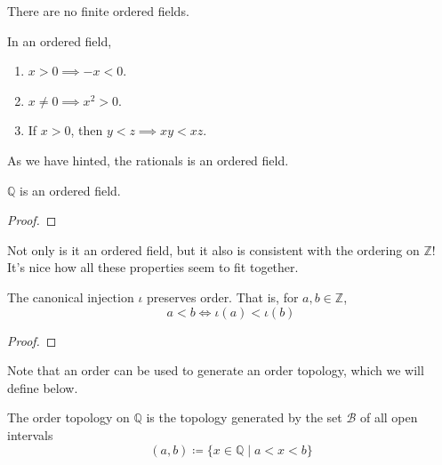 \documentclass{article}
\begin{document}
      \begin{theorem}
        There are no finite ordered fields. 
      \end{theorem} 

      \begin{theorem}[Properties]
        In an ordered field, 
        \begin{enumerate}
          \item $x > 0 \implies -x < 0$. 
          \item $x \neq 0 \implies x^2 > 0$. 
          \item If $x > 0$, then $y < z \implies xy < xz$. 
        \end{enumerate}
      \end{theorem} 

      As we have hinted, the rationals is an ordered field. 

      \begin{theorem}
        $\mathbb{Q}$ is an ordered field. 
      \end{theorem} 
      \begin{proof}
        
      \end{proof} 

      Not only is it an ordered field, but it also is consistent with the ordering on $\mathbb{Z}$! It's nice how all these properties seem to fit together. 

      \begin{theorem}
        The canonical injection $\iota$ preserves order. That is, for $a, b \in \mathbb{Z}$, 
        \begin{equation}
          a < b \iff \iota(a) < \iota(b)
        \end{equation}
      \end{theorem}
      \begin{proof}
        
      \end{proof}

      Note that an order can be used to generate an order topology, which we will define below. 

      \begin{definition}
        The order topology on $\mathbb{Q}$ is the topology generated by the set $\mathscr{B}$ of all open intervals 
        \begin{equation}
          (a, b) \coloneqq \{ x \in \mathbb{Q} \mid a < x < b\}
        \end{equation}
      \end{definition}
\end{document}
